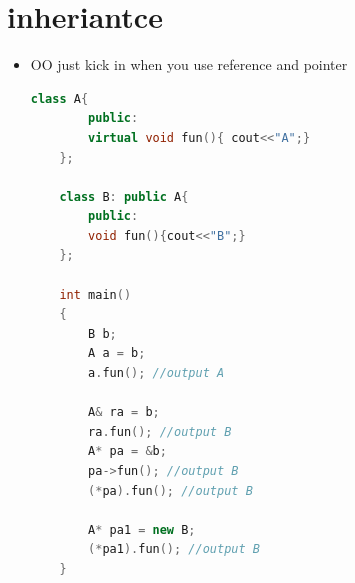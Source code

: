 \documentclass[a4paper,12pt,twoside]{book}
\begin{document}
\section{inheriantce}
\begin{itemize}
	\item OO just kick in when you use reference and pointer
\begin{lstlisting}[frame=single, language=c++]
	class A{
		public:
		virtual void fun(){ cout<<"A";}
	};
	
	class B: public A{
		public:
		void fun(){cout<<"B";}
	};
	
	int main()
	{
		B b;
		A a = b;
		a.fun(); //output A
		
		A& ra = b;
		ra.fun(); //output B
		A* pa = &b;
		pa->fun(); //output B
		(*pa).fun(); //output B
		
		A* pa1 = new B;
		(*pa1).fun(); //output B
	}
\end{lstlisting}
\end{itemize}
\end{document}
